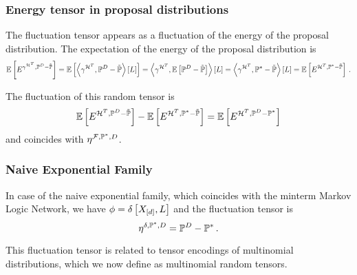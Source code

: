 \subsubsection{Energy tensor in proposal distributions}

The fluctuation tensor appears as a fluctuation of the energy of the proposal distribution.
The expectation of the energy of the proposal distribution is
\begin{align*}
	\mathbb{E}\left[E^{\gamma^{\mathcal{H}^T},\mathbb{P}^{D}-\tilde{\mathbb{P}}}\right] 
	= \mathbb{E}\left[\left\langle \gamma^{\mathcal{H}^T},\mathbb{P}^{D}-\tilde{\mathbb{P}}\right\rangle \left[ L \right]\right] 
	= \left\langle \gamma^{\mathcal{H}^T},\mathbb{E}\left[\mathbb{P}^{D}-\tilde{\mathbb{P}}\right]\right\rangle \left[ L \right]
	= \left\langle \gamma^{\mathcal{H}^T},\mathbb{P}^*-\tilde{\mathbb{P}}\right\rangle \left[ L \right] 
	= \mathbb{E}\left[E^{\mathcal{H}^T,\mathbb{P}^*-\tilde{\mathbb{P}}}\right] \, . 
\end{align*}

The fluctuation of this random tensor is
\begin{align*}
	\mathbb{E}\left[E^{\mathcal{H}^T,\mathbb{P}^{D}-\tilde{\mathbb{P}}}\right]  - \mathbb{E}\left[E^{\mathcal{H}^T,\mathbb{P}^*-\tilde{\mathbb{P}}}\right] 
	= \mathbb{E}\left[E^{\mathcal{H}^T,\mathbb{P}^{D}-\mathbb{P}^*}\right]
\end{align*}
and coincides with $\eta^{\mathcal{F},\mathbb{P}^*,D}$.
	







\subsubsection{Naive Exponential Family} %

In case of the naive exponential family, which coincides with the minterm Markov Logic Network, we have $\phi=\delta\left[X_{[d]},L\right]$ and the fluctuation tensor is
	\[ \eta^{\delta,\mathbb{P}^*,D} = \mathbb{P}^{D} - \mathbb{P}^* \, .  \]

This fluctuation tensor is related to tensor encodings of multinomial distributions, which we now define as multinomial random tensors.

